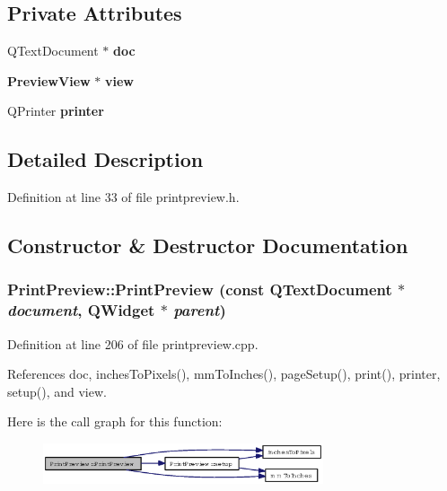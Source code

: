 \subsection*{Private Attributes}
\begin{CompactItemize}
\item 
QText\-Document $\ast$ {\bf doc}
\item 
{\bf Preview\-View} $\ast$ {\bf view}
\item 
QPrinter {\bf printer}
\end{CompactItemize}


\subsection{Detailed Description}




Definition at line 33 of file printpreview.h.

\subsection{Constructor \& Destructor Documentation}
\subsubsection{\setlength{\rightskip}{0pt plus 5cm}Print\-Preview::Print\-Preview (const QText\-Document $\ast$ {\em document}, QWidget $\ast$ {\em parent})}\label{classPrintPreview_63a9c66336e4b066d7a85867f48bdf19}




Definition at line 206 of file printpreview.cpp.

References doc, inches\-To\-Pixels(), mm\-To\-Inches(), page\-Setup(), print(), printer, setup(), and view.

Here is the call graph for this function:\begin{figure}[H]
\begin{center}
\leavevmode
\includegraphics[width=234pt]{classPrintPreview_63a9c66336e4b066d7a85867f48bdf19_cgraph}
\end{center}
\end{figure}
